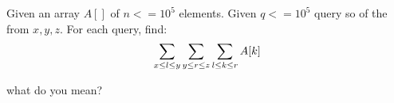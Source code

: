 \documentclass[]{article}
\begin{document}
Given an array $A[]$ of $n <= 10^5$ elements.
Given $q <= 10^5$ query so of the from $x, y, z$.
For each query, find:
$$\huge \sum_{x \le l \le y} \sum_{y \le r \le z} \sum_{l \le k \le r}A[k]$$


what do you mean?
\end{document}
